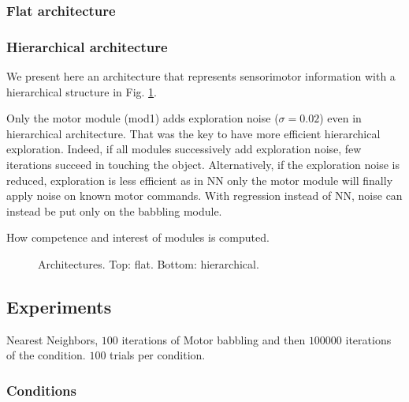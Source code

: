 \documentclass[10pt,letterpaper]{article}
\begin{document}
				
		
		\subsubsection{Flat architecture}
			
				
		
		\subsubsection{Hierarchical architecture}
			
			We present here an architecture that represents sensorimotor information with a hierarchical structure in Fig. \ref{Architectures}.
			
			Only the motor module (mod1) adds exploration noise ($\sigma=0.02$) even in hierarchical architecture. 
			That was the key to have more efficient hierarchical exploration. 
			Indeed, if all modules successively add exploration noise, few iterations succeed in touching the object. 
			Alternatively, if the exploration noise is reduced, exploration is less efficient as in NN only the motor module will finally apply noise on known motor commands. 
			With regression instead of NN, noise can instead be put only on the babbling module.
			
			How competence and interest of modules is computed.
			
			\begin{figure}[t]
				\center
				
				\vspace{-0.25cm}
				
				\vspace{-0.5cm}
				\caption{Architectures. Top: flat. Bottom: hierarchical.}
				\label{Architectures}					
			\end{figure}

				
		

	
	\subsection{Experiments}
		
		Nearest Neighbors, $100$ iterations of Motor babbling and then $100000$ iterations of the condition. $100$ trials per condition.
		
		
		\subsubsection{Conditions}
			
\end{document}
